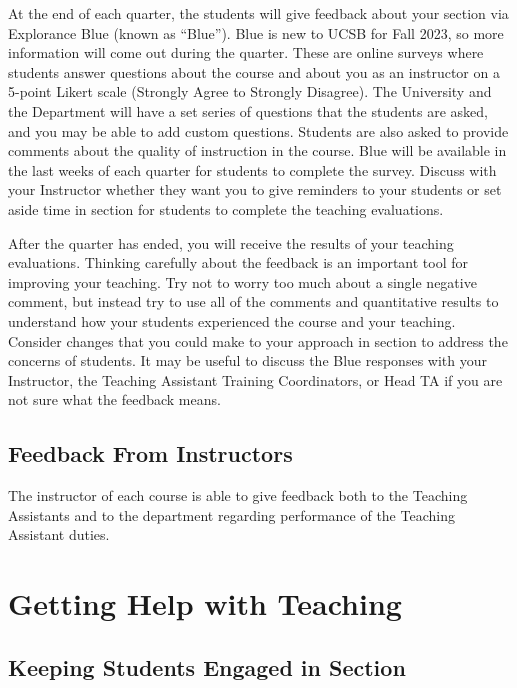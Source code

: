 \documentclass[
  letterpaper,
  DIV=11,
  numbers=noendperiod]{scrreprt}
\begin{document}
At the end of each quarter, the students will give feedback about your
section via Explorance Blue (known as ``Blue''). Blue is new to UCSB for
Fall 2023, so more information will come out during the quarter. These
are online surveys where students answer questions about the course and
about you as an instructor on a 5-point Likert scale (Strongly Agree to
Strongly Disagree). The University and the Department will have a set
series of questions that the students are asked, and you may be able to
add custom questions. Students are also asked to provide comments about
the quality of instruction in the course. Blue will be available in the
last weeks of each quarter for students to complete the survey. Discuss
with your Instructor whether they want you to give reminders to your
students or set aside time in section for students to complete the
teaching evaluations.

After the quarter has ended, you will receive the results of your
teaching evaluations. Thinking carefully about the feedback is an
important tool for improving your teaching. Try not to worry too much
about a single negative comment, but instead try to use all of the
comments and quantitative results to understand how your students
experienced the course and your teaching. Consider changes that you
could make to your approach in section to address the concerns of
students. It may be useful to discuss the Blue responses with your
Instructor, the Teaching Assistant Training Coordinators, or Head TA if
you are not sure what the feedback means.

\hypertarget{feedback-from-instructors}{%
\chapter{Feedback From Instructors}\label{feedback-from-instructors}}

The instructor of each course is able to give feedback both to the
Teaching Assistants and to the department regarding performance of the
Teaching Assistant duties.

\part{\textbf{Getting Help with Teaching}}

\hypertarget{keeping-students-engaged-in-section}{%
\chapter{Keeping Students Engaged in
Section}\label{keeping-students-engaged-in-section}}
\end{document}
